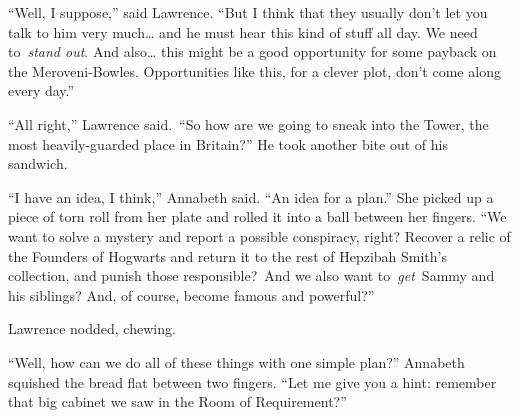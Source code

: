``Well, I suppose,'' said Lawrence. ``But I think that they usually
don't let you talk to him very much\ldots{} and he must hear this kind
of stuff all day. We need to~\emph{stand out}. And also\ldots{} this
might be a good opportunity for some payback on the Meroveni-Bowles.
Opportunities like this, for a clever plot, don't come along every
day.''

``All right,'' Lawrence said.~``So how are we going to sneak into the
Tower, the most heavily-guarded place in Britain?'' He took another bite
out of his sandwich.

``I have an idea, I think,'' Annabeth said. ``An idea for a plan.'' She
picked up a piece of torn roll from her plate and rolled it into a ball
between her fingers. ``We want to solve a mystery and report a possible
conspiracy, right? Recover a relic of the Founders of Hogwarts and
return it to the rest of Hepzibah Smith's collection, and punish those
responsible?~And we also want to~\emph{get}~Sammy and his siblings? And,
of course, become famous and powerful?''

Lawrence nodded, chewing.

``Well, how can we do all of these things with one simple plan?''
Annabeth squished the bread flat between two fingers. ``Let me give you
a hint: remember that big cabinet we saw in the Room of Requirement?''
